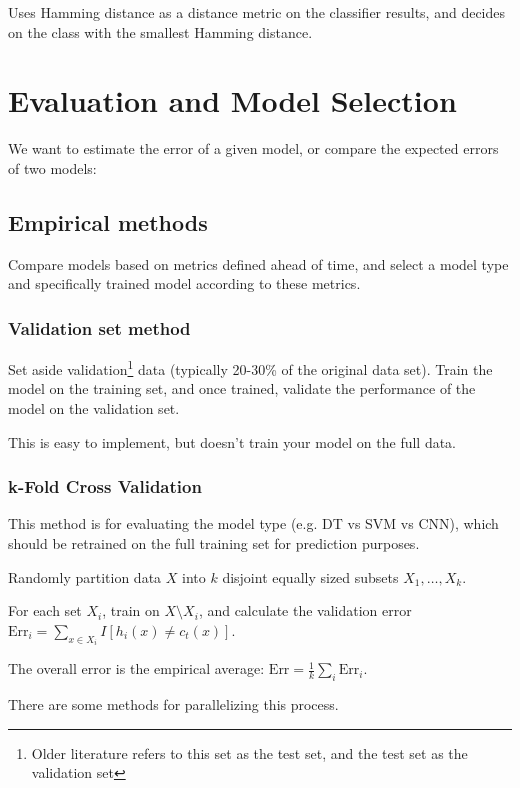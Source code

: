 \documentclass{idc_msc}
\begin{document}
Uses Hamming distance as a distance metric on the classifier results, and decides on the class with the smallest Hamming distance.

\section{Evaluation and Model Selection}

We want to estimate the error of a given model, or compare the expected errors of two models:

\subsection{Empirical methods}

Compare models based on metrics defined ahead of time, and select a model type and specifically trained model according to these metrics.

\subsubsection{Validation set method}

Set aside validation\footnote{Older literature refers to this set as the test set, and the test set as the validation set} data (typically 20-30\% of the original data set).
Train the model on the training set, and once trained, validate the performance of the model on the validation set.

This is easy to implement, but doesn't train your model on the full data.

\subsubsection{k-Fold Cross Validation}

This method is for evaluating the model type (e.g. DT vs SVM vs CNN), which should be retrained on the full training set for prediction purposes.

Randomly partition data \(X\) into \(k\) disjoint equally sized subsets \(X_1, \ldots, X_k\).

For each set \(X_i\), train on \(X \setminus X_i\), and calculate the validation error \(\text{Err}_i = \sum_{x \in X_i} I[h_i(x) \ne c_t(x)]\).

The overall error is the empirical average: \(\text{Err} = \frac{1}{k} \sum_i \text{Err}_i\).

There are some methods for parallelizing this process.
\end{document}
